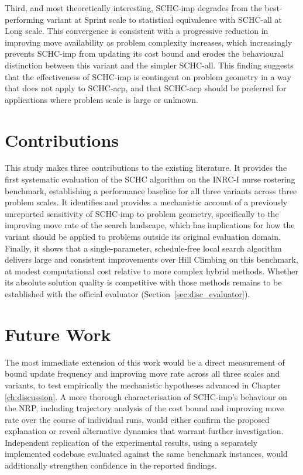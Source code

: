 \documentclass[12pt, a4paper, oneside]{report}
\begin{document}
Third, and most theoretically interesting, SCHC-imp degrades from
the best-performing variant at Sprint scale to statistical
equivalence with SCHC-all at Long scale. This convergence is
consistent with a progressive reduction in improving move
availability as problem complexity increases, which increasingly
prevents SCHC-imp from updating its cost bound and erodes the
behavioural distinction between this variant and the simpler
SCHC-all. This finding suggests that the effectiveness of SCHC-imp
is contingent on problem geometry in a way that does not apply to
SCHC-acp, and that SCHC-acp should be preferred for applications
where problem scale is large or unknown.

\section{Contributions}
\label{sec:conc_contributions}

This study makes three contributions to the existing literature.
It provides the first systematic evaluation of the SCHC algorithm
\citet{Bykov2016} on the INRC-I nurse rostering benchmark,
establishing a performance baseline for all three variants across
three problem scales. It identifies and provides a mechanistic
account of a previously unreported sensitivity of SCHC-imp to
problem geometry, specifically to the improving move rate of the
search landscape, which has implications for how the variant should
be applied to problems outside its original evaluation domain.
Finally, it shows that a single-parameter, schedule-free local search
algorithm delivers large and consistent improvements over Hill
Climbing on this benchmark, at modest computational cost relative to
more complex hybrid methods. Whether its absolute solution quality
is competitive with those methods remains to be established with the
official evaluator (Section~\ref{sec:disc_evaluator}).

\section{Future Work}
\label{sec:conc_future}

The most immediate extension of this work would be a direct
measurement of bound update frequency and improving move rate across
all three scales and variants, to test empirically the mechanistic
hypotheses advanced in Chapter \ref{ch:discussion}. A more thorough
characterisation of SCHC-imp's behaviour on the NRP, including
trajectory analysis of the cost bound and improving move rate over
the course of individual runs, would either confirm the proposed
explanation or reveal alternative dynamics that warrant further
investigation. Independent replication of the experimental results,
using a separately implemented codebase evaluated against the same
benchmark instances, would additionally strengthen confidence in the
reported findings.
\end{document}
